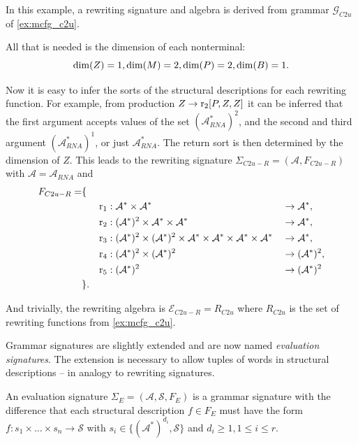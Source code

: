 \documentclass[
    a4paper,
    12pt,
    twoside,
    BCOR=12mm,
    parskip=half,
    chapterprefix,
    numbers=noenddot,
    bibliography=totoc
]{scrbook}
\begin{document}
\begin{example}
	\label{ex:rewriting_sig}
	In this example, a rewriting signature and algebra is derived from grammar $\mathcal{G}_{C2u}$ of \cref{ex:mcfg_c2u}.
	
	All that is needed is the dimension of each nonterminal:
	\begin{equation*}
		\mathrm{dim}(Z)=1,\mathrm{dim}(M)=2,\mathrm{dim}(P)=2,\mathrm{dim}(B)=1.
	\end{equation*}
	
	Now it is easy to infer the sorts of the structural descriptions for each rewriting function. For example, from production $Z \to \mathrm{r}_2[P,Z,Z]$ it can be inferred that the first argument accepts values of the set $(\mathcal{A}^*_{RNA})^2$, and the second and third argument $(\mathcal{A}^*_{RNA})^1$, or just $\mathcal{A}^*_{RNA}$. The return sort is then determined by the dimension of $Z$. This leads to the rewriting signature $\Sigma_{C2u-R}=(\mathcal{A},F_{C2u-R})$ with $\mathcal{A} = \mathcal{A}_{RNA}$ and
	\begin{align*}
		F_{C2u-R} = &\{&&&&\\
		&&\mathrm{r}_1 &: \mathcal{A}^* \times \mathcal{A}^* &&\to \mathcal{A}^*,\\
		&&\mathrm{r}_2 &: (\mathcal{A}^*)^2 \times \mathcal{A}^* \times \mathcal{A}^* &&\to \mathcal{A}^*,\\
		&&\mathrm{r}_3 &: (\mathcal{A}^*)^2 \times (\mathcal{A}^*)^2 \times \mathcal{A}^* \times \mathcal{A}^* \times \mathcal{A}^* \times \mathcal{A}^* &&\to \mathcal{A}^*,\\
		&&\mathrm{r}_4 &: (\mathcal{A}^*)^2 \times (\mathcal{A}^*)^2 &&\to (\mathcal{A}^*)^2,\\
		&&\mathrm{r}_5 &: (\mathcal{A}^*)^2 &&\to (\mathcal{A}^*)^2\\
		&\}.&&&&
	\end{align*}
	
	And trivially, the rewriting algebra is $\mathcal{E}_{C2u-R}=R_{C2u}$ where $R_{C2u}$ is the set of rewriting functions from \cref{ex:mcfg_c2u}.
\end{example}

Grammar signatures are slightly extended and are now named \emph{evaluation signatures}. The extension is necessary to allow tuples of words in structural descriptions -- in analogy to rewriting signatures.

\begin{definition}
	An evaluation signature $\Sigma_E=(\mathcal{A},\mathcal{S},F_E)$ is a grammar signature with the difference that each structural description $f \in F_E$ must have the form $f : s_1 \times \ldots \times s_n \to \mathcal{S}$ with $s_i \in \{ (\mathcal{A}^*)^{d_i}, \mathcal{S} \}$ and $d_i \geq 1, 1 \leq i \leq r$. 
\end{definition}
\end{document}
